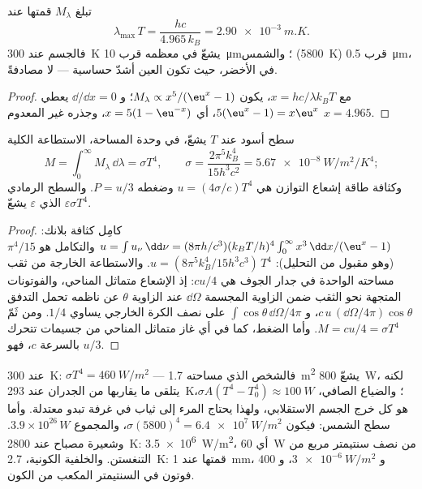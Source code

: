 \begin{proposition}\label{prop:b2:thermal-radiation:wien}
تبلغ  $M_\lambda$ قمتها عند
\[
\lambda_{\max}\,T = \frac{hc}{4.965\,k_B} = \qty{2.90e-3}{m.K} .
\]
فالجسم عند \qty{300}{K} يشعّ في معظمه قرب \qty{10}{\micro m}؛ والشمس
(\qty{5800}{K}) قرب \qty{0.5}{\micro m}، في الأخضر، حيث تكون العين
أشدّ حساسية --- لا مصادفةً.
\end{proposition}

\begin{proof}
مع $x = hc/\lambda k_BT$، يكون $M_\lambda \propto x^5/(\eu^x - 1)$؛ و $\dd/\dd x = 0$
يعطي $5(\eu^x - 1) = x\eu^x$، أي $x = 5(1 - \eu^{-x})$، وجذره
غير المعدوم $x = 4.965$.
\end{proof}

\begin{theorem}\label{thm:b2:thermal-radiation:stefan}
سطح أسود عند $T$ يشعّ، في وحدة المساحة، الاستطاعة الكلية
\[
M = \int_0^\infty M_\lambda\,\dd\lambda = \sigma T^4, \qquad
\sigma = \frac{2\pi^5k_B^4}{15h^3c^2} = \qty{5.67e-8}{W/m^2/K^4} ;
\]
وكثافة طاقة إشعاع التوازن هي $u = (4\sigma/c)T^4$
وضغطه $P = u/3$. والسطح الرمادي الذي  $\varepsilon$
يشعّ $\varepsilon\sigma T^4$.
\end{theorem}

\begin{proof}
كامِل كثافة بلانك: $u = \int u_\nu\,\dd\nu = (8\pi h/c^3)(k_BT/h)^4
\int_0^\infty x^3\,\dd x/(\eu^x - 1)$ والتكامل هو $\pi^4/15$
(وهو مقبول من التحليل): $u = (8\pi^5k_B^4/15h^3c^3)\,T^4$. والاستطاعة
الخارجة من ثقب مساحته الواحدة في جدار الجوف هي $cu/4$: إذ
الإشعاع متماثل المناحي، والفوتونات المتجهة نحو الثقب ضمن
الزاوية المجسمة $\dd\Omega$ عند الزاوية $\theta$ عن ناظمه تحمل
التدفق $c\,u\,(\dd\Omega/4\pi)\cos\theta$، و $\int\cos\theta\,\dd\Omega/4\pi$
على نصف الكرة الخارجي يساوي $1/4$. ومن ثَمّ $M = cu/4 = \sigma T^4$.
وأما الضغط، كما في أي غاز متماثل المناحي من جسيمات تتحرك بالسرعة $c$، فهو
$u/3$.
\end{proof}

\begin{example}\label{ex:b2:thermal-radiation:orders}
عند \qty{300}{K}: $\sigma T^4 = \qty{460}{W/m^2}$ --- فالشخص الذي مساحته
\qty{1.7}{m^2} يشعّ \qty{800}{W}، لكنه يتلقى ما يقاربها من
الجدران عند \qty{293}{K}؛ والضياع الصافي، $\sigma A(T^4 - T_0^4) \approx
\qty{100}{W}$، هو كل خرج الجسم الاستقلابي، ولهذا
يحتاج المرء إلى ثياب في غرفة تبدو معتدلة. وأما سطح الشمس: فيكون $\sigma
(5800)^4 = \qty{6.4e7}{W/m^2}$، والمجموع $3.9 \times 10^{26}\,\unit{W}$. وشعيرة
مصباح عند \qty{2800}{K}: \qty{3.5e6}{W/m^2}، أي \qty{60}{W} من نصف
سنتيمتر مربع من التنغستن. والخلفية الكونية، \qty{2.7}{K}:
قمتها عند \qty{1}{mm}، و $\qty{3e-6}{W/m^2}$، و $400$ فوتون في السنتيمتر
المكعب من الكون.
\end{example}

